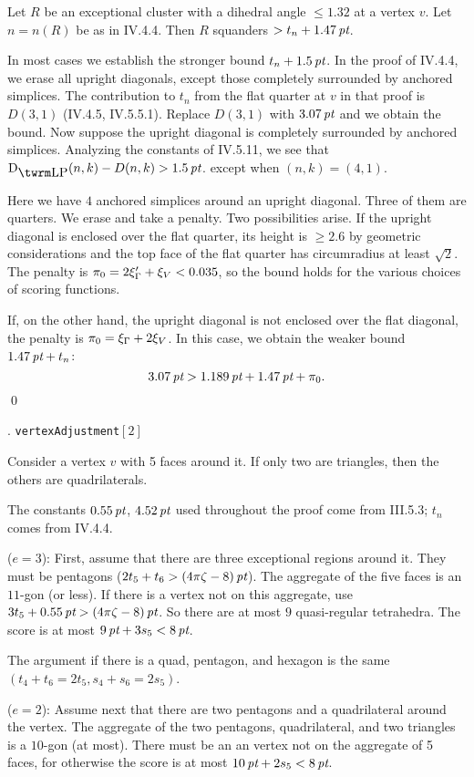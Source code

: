  Let $R$ be an exceptional cluster with a dihedral
angle $\le1.32$ at a vertex $v$.  Let $n=n(R)$ be as in IV.4.4.
Then $R$ squanders $>t_n+1.47\,\hbox{\it pt}$.
\endproclaim

In most cases we establish the stronger bound $t_n+1.5\,\hbox{\it pt}$.  
In the proof of IV.4.4, we erase all upright diagonals, except
those completely surrounded by anchored simplices.  The contribution
to $t_n$ from the flat quarter at $v$ in that proof is
$D(3,1)$ (IV.4.5, IV.5.5.1).
Replace $D(3,1)$ with $3.07\,\hbox{\it pt}$ and we obtain the bound.
Now suppose the upright diagonal
is completely surrounded by anchored simplices.  
  Analyzing the constants of IV.5.11,
we see that $\DLP(n,k)-D(n,k)>1.5\,\pt$.
except when $(n,k)=(4,1)$.

Here we have $4$ anchored simplices around an upright diagonal.
Three of them are quarters.  We erase and take a penalty.
Two possibilities arise.  If the upright diagonal is
enclosed over the flat quarter, its height is $\ge2.6$ by
geometric considerations and the top face of the flat
quarter has circumradius at least $\sqrt2$.  The penalty
is $\pi_0 = 2\xi_\Gamma' + \xi_V< 0.035$, so the
bound holds for the various choices of scoring functions.

If, on the other hand, the upright diagonal is not
enclosed over the flat diagonal, the penalty is
$\pi_0 = \xi_\Gamma + 2\xi_V$.  In this case, we
obtain the weaker bound $1.47\,\hbox{\it pt}+t_n$:
	$$3.07\,\hbox{\it pt} > 1.189\,\hbox{\it pt} + 1.47\,\hbox{\it pt} +\pi_0.$$
\qed
\enddemo



. {\tt vertexAdjustment}$[2]$ \endsubhead

 Consider a vertex $v$ with 5 faces around it.
If only two are triangles, then the others are quadrilaterals.
\endproclaim

The constants $0.55\,\hbox{\it pt}$, $4.52\,\hbox{\it pt}$ used throughout the proof
come from III.5.3; $t_n$ comes from IV.4.4.

($e=3$):
First, assume that there are three exceptional regions around it.
They must be pentagons ($2t_5+t_6>(4\pi\zeta-8)\,\hbox{\it pt}$).  The aggregate
of the five faces is an $11$-gon (or less).  If there is a vertex
not on this aggregate, use $3t_5+0.55\,\hbox{\it pt}>(4\pi\zeta-8)\,\hbox{\it pt}$.
So there are at most $9$ quasi-regular tetrahedra.  The
score is at most $9\,\hbox{\it pt} + 3 s_5 < 8\,\hbox{\it pt}$.

The argument if there is a quad, pentagon, and hexagon is the
same $(t_4+t_6=2t_5,s_4+s_6=2s_5)$.

($e=2$):
Assume next that there are two pentagons and a quadrilateral
around the vertex.  
The aggregate of the two pentagons, quadrilateral, and two triangles
is a $10$-gon (at most).  
There must be an an vertex not on the aggregate of 5 faces, for
otherwise the score is at most $10\,\hbox{\it pt}+2s_5<8\,\hbox{\it pt}$.

